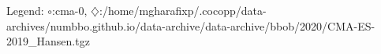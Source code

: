 Legend: {\color{NavyBlue}$\circ$}:cma-0, {\color{Magenta}$\diamondsuit$}:/home/mgharafixp/.cocopp/data-archives/numbbo.github.io/data-archive/data-archive/bbob/2020/CMA-ES-2019\_Hansen.tgz